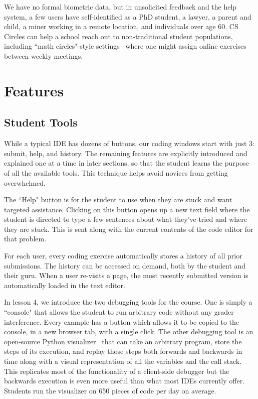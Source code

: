 \documentclass{article}
\begin{document}
{We have no formal biometric data, but in unsolicited feedback and the help system, a few users have self-identified as a PhD student, a lawyer, a parent and child, a miner working in a remote location, and individuals over age 60. CS Circles can help a school reach out to non-traditional student populations, including ``math circles"-style settings~\cite{kaplan2007} where one might assign online exercises between weekly meetings.

\section{Features}\label{sec:features}


\subsection{Student Tools}\label{sec:studenttools}
While a typical IDE has dozens of buttons, our coding windows start with just 3: submit, help, and history. The remaining features are explicitly introduced and explained one at a time in later sections, so that the student learns the purpose of all the available tools. This technique helps avoid novices from getting overwhelmed.

The ``Help" button is for the student to use when they are stuck and want targeted assistance. Clicking on this button opens up a new text field where the student is directed to type a few sentences about what they've tried and where they are stuck. This is sent along with the current contents of the code editor for that problem.

For each user, every coding exercise automatically stores a history of all prior submissions. The history can be accessed on demand, both by the student and their guru. When a user re-visits a page, the most recently submitted version is automatically loaded in the text editor.

In lesson 4, we introduce the two debugging tools for the course. One is simply a ``console" that allows the student to run arbitrary code without any grader interference. Every example has a button which allows it to be copied to the console, in a new browser tab, with a single click. The other debugging tool is an open-source Python visualizer~\cite{Guo11} that can take an arbitrary program, store the steps of its execution, and replay those steps both forwards and backwards in time along with a visual representation of all the variables and the call stack. This replicates most of the functionality of a client-side debugger but the backwards execution is even more useful than what most IDEs currently offer. Students run the visualizer on 650 pieces of code per day on average.

}
\end{document}
